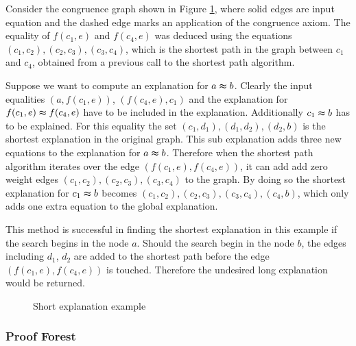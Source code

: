 \begin{example}
Consider the congruence graph shown in Figure \ref{fig:short_expl}, where solid edges are input equation and the dashed edge marks an application of the congruence axiom.
The equality of $f(c_1,e)$ and $f(c_4,e)$ was deduced using the equations $(c_1,c_2),(c_2,c_3),(c_3,c_4)$, which is the shortest path in the graph between $c_1$ and $c_4$, obtained from a previous call to the shortest path algorithm.

Suppose we want to compute an explanation for $a \thickapprox b$.
Clearly the input equalities $(a,f(c_1,e))$, $(f(c_4,e),c_1)$ and the explanation for $f(c_1,e) \thickapprox f(c_4,e)$ have to be included in the explanation.
Additionally $c_1 \thickapprox b$ has to be explained.
For this equality the set $(c_1,d_1),(d_1,d_2),(d_2,b)$ is the shortest explanation in the original graph.
This sub explanation adds three new equations to the explanation for $a \thickapprox b$.
Therefore when the shortest path algorithm iterates over the edge $(f(c_1,e),f(c_4,e))$, it can add add zero weight edges $(c_1,c_2),(c_2,c_3),(c_3,c_4)$ to the graph.
By doing so the shortest explanation for $c_1 \thickapprox b$ becomes $(c_1,c_2),(c_2,c_3),(c_3,c_4),(c_4,b)$, which only adds one extra equation to the global explanation.

This method is successful in finding the shortest explanation in this example if the search begins in the node $a$.
Should the search begin in the node $b$, the edges including $d_1$, $d_2$ are added to the shortest path before the edge $(f(c_1,e),f(c_4,e))$ is touched.
Therefore the undesired long explanation would be returned.

\begin{figure}[!h]

\caption{Short explanation example}
\label{fig:short_expl}
\end{figure}

\label{ex:short_expl}
\end{example}





\FloatBarrier

\subsubsection*{Proof Forest}


